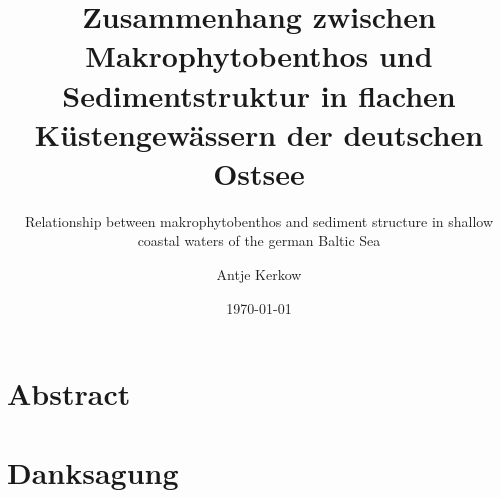 



\pagestyle{empty}



\titlehead{Ernst Moritz Arndt Universität Greifswald\\
           Fachbereich Naturwissenschaften\\
           Institut für Landschaftsökologie und Naturschutz}

\subject{Diplomarbeit}

\title{Zusammenhang zwischen Makrophytobenthos und Sedimentstruktur in flachen Küstengewässern der deutschen Ostsee}

\subtitle{Relationship between makrophytobenthos and sediment structure in shallow coastal waters of the german Baltic Sea}

\author{Antje Kerkow}

\date{\today} 

\publishers{Dozenten:\\PD Dr. Irmgard Blindow \\Prof. Dr. Hendrik Schubert}





\maketitle %
\clearpage

\section*{Abstract}

\clearpage

\section*{Danksagung}

\clearpage


